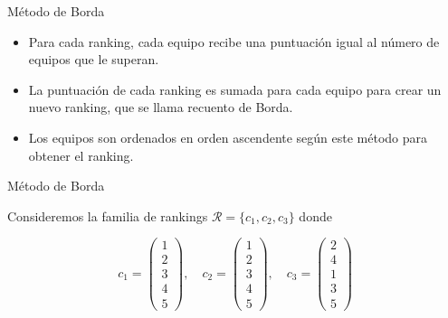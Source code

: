 \documentclass[10pt,hyperref={unicode}]{beamer}
\begin{document}
	\begin{frame}{Método de Borda}
		
		\begin{itemize}
			\item Para cada ranking, cada equipo recibe una puntuación igual al número de equipos que le superan.
			
			\item La puntuación de cada ranking es sumada para cada equipo para crear un nuevo ranking, que se llama recuento de Borda.
			
			\item Los equipos son ordenados en orden ascendente según este método para obtener el ranking.
		\end{itemize}
		
	\end{frame}
	
	\begin{frame}{Método de Borda}
		
		\begin{ejemplo}
			Consideremos la familia de rankings $\mathcal{R} = \{c_1, c_2, c_3\}$ donde
			
			\begin{equation*}
			c_1 = \left( \begin{array}{c}
			1\\
			2\\
			3\\
			4\\
			5
			\end{array} \right), \quad
			c_2 = \left( \begin{array}{c}
			1\\
			2\\
			3\\
			4\\
			5
			\end{array} \right), \quad
			c_3 = \left( \begin{array}{c}
			2\\
			4\\
			1\\
			3\\
			5
			\end{array} \right)
			\end{equation*}
			 
		\end{ejemplo}
	
		
	\end{frame}
	
\end{document}
